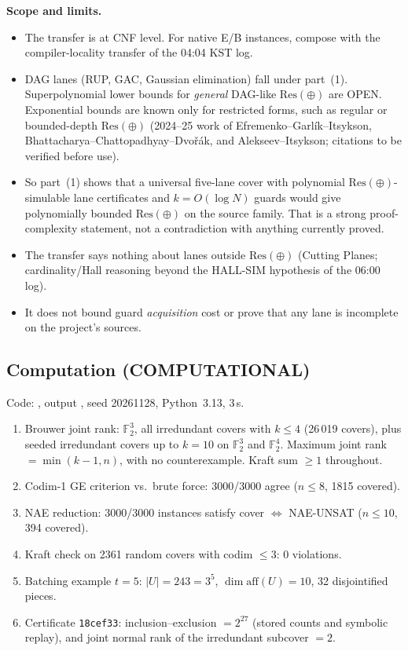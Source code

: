 \documentclass[11pt]{article}
\theoremstyle{definition}
\newcommand{\F}{\mathbb{F}_2}
\newcommand{\Resx}{\mathrm{Res}(\oplus)}
\begin{document}
\noindent\textbf{Scope and limits.}
\begin{itemize}
\item The transfer is at CNF level. For native E/B instances, compose with the compiler-locality transfer of the 04:04 KST log.
\item DAG lanes (RUP, GAC, Gaussian elimination) fall under part~(1). Superpolynomial lower bounds for \emph{general} DAG-like $\Resx$ are OPEN. Exponential bounds are known only for restricted forms, such as regular or bounded-depth $\Resx$ (2024--25 work of Efremenko--Garl\'ik--Itsykson, Bhattacharya--Chattopadhyay--Dvo\v{r}\'ak, and Alekseev--Itsykson; citations to be verified before use).
\item So part~(1) shows that a universal five-lane cover with polynomial $\Resx$-simulable lane certificates and $k=O(\log N)$ guards would give polynomially bounded $\Resx$ on the source family. That is a strong proof-complexity statement, not a contradiction with anything currently proved.
\item The transfer says nothing about lanes outside $\Resx$ (Cutting Planes; cardinality/Hall reasoning beyond the HALL-SIM hypothesis of the 06:00 log).
\item It does not bound guard \emph{acquisition} cost or prove that any lane is incomplete on the project's sources.
\end{itemize}

\subsection{Computation (COMPUTATIONAL)}
Code: , output , seed 20261128, Python~3.13, 3\,s.
\begin{enumerate}
\item Brouwer joint rank: $\F^3$, all irredundant covers with $k\le 4$ (26\,019 covers), plus seeded irredundant covers up to $k=10$ on $\F^3$ and $\F^4$. Maximum joint rank $=\min(k-1,n)$, with no counterexample. Kraft sum $\ge1$ throughout.
\item Codim-1 GE criterion vs.\ brute force: 3000/3000 agree ($n\le8$, 1815 covered).
\item NAE reduction: 3000/3000 instances satisfy cover $\iff$ NAE-UNSAT ($n\le10$, 394 covered).
\item Kraft check on 2361 random covers with codim $\le3$: 0 violations.
\item Batching example $t=5$: $|U|=243=3^5$, $\dim\mathrm{aff}(U)=10$, 32 disjointified pieces.
\item Certificate \texttt{18cef33}: inclusion--exclusion $=2^{27}$ (stored counts and symbolic replay), and joint normal rank of the irredundant subcover $=2$.
\end{enumerate}
\end{document}

